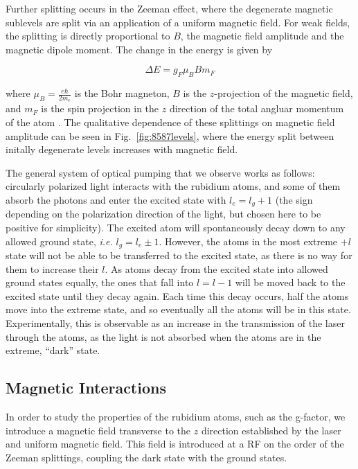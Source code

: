 Further splitting occurs in the Zeeman effect, where the degenerate
magnetic sublevels are split via an application of a uniform magnetic
field. For weak fields, the splitting is directly proportional to $B$,
the magnetic field amplitude and the magnetic dipole moment. The
change in the energy is given by

\begin{equation}
\Delta E = g_F\mu_B B m_F
\label{eqn:zeeman}
\end{equation}

where $\mu_B = \frac{e\hbar}{2m_e}$ is the Bohr magneton, $B$ is the
$z$-projection of the magnetic field, and $m_F$ is the spin projection
in the $z$ direction of the total angluar momentum of the atom
\cite{budker }. The qualitative dependence of these splittings on
magnetic field amplitude can be seen in Fig.~\ref{fig:8587levels},
where the energy split between initally degenerate levels increases
with magnetic field.

The general system of optical pumping that we observe works as
follows: circularly polarized light interacts with the rubidium atoms,
and some of them absorb the photons and enter the excited state with
$l_{e}=l_{g}+1$ (the sign depending on the polarization direction of
the light, but chosen here to be positive for simplicity). The excited
atom will spontaneously decay down to any allowed ground state,
\emph{i.e.} $l_{g} = l_{e} \pm 1$. However, the atoms in the most
extreme $+l$ state will not be able to be transferred to the excited
state, as there is no way for them to increase their $l$. As atoms
decay from the excited state into allowed ground states equally, the
ones that fall into $l=l-1$ will be moved back to the excited state
until they decay again. Each time this decay occurs, half the atoms
move into the extreme state, and so eventually all the atoms will be
in this state. Experimentally, this is observable as an increase in
the transmission of the laser through the atoms, as the light is not
absorbed when the atoms are in the extreme, ``dark'' state.


\subsection{Magnetic Interactions}

In order to study the properties of the rubidium atoms, such as the
g-factor, we introduce a magnetic field transverse to the $z$
direction established by the laser and uniform magnetic field. This
field is introduced at a RF on the order of the Zeeman splittings,
coupling the dark state with the ground states. 


